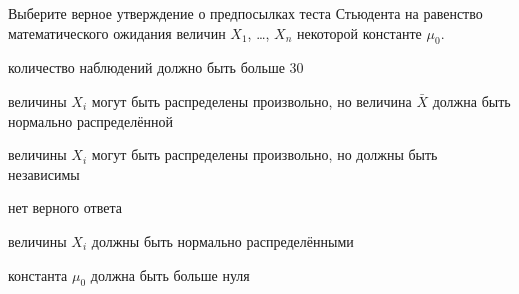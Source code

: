 
\begin{question}
Выберите верное утверждение о предпосылках теста Стьюдента на равенство
математического ожидания величин \(X_1\), \ldots, \(X_n\) некоторой
константе \(\mu_0\).
\begin{answerlist}
  \item количество наблюдений должно быть больше 30
  \item величины \(X_i\) могут быть распределены произвольно, но величина
\(\bar X\) должна быть нормально распределённой
  \item величины \(X_i\) могут быть распределены произвольно, но должны быть
независимы
  \item нет верного ответа
  \item величины \(X_i\) должны быть нормально распределёнными
  \item константа \(\mu_0\) должна быть больше нуля
\end{answerlist}
\end{question}



